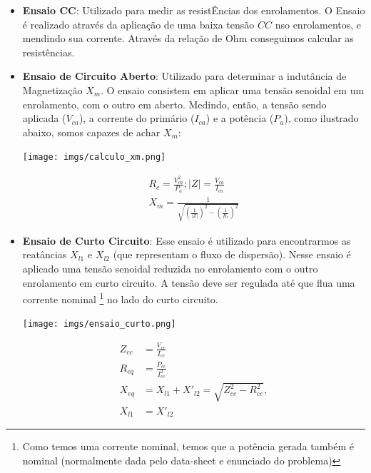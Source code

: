\documentclass{article}
\newcommand{\n}{\nonumber \\ }
\begin{document}
\begin{itemize}
    \item \textbf{Ensaio CC}: Utilizado para medir as resistÊncias dos enrolamentos. O Ensaio é realizado através da aplicação de uma baixa tensão $CC$ nso enrolamentos, e mendindo sua corrente. Através da relação de Ohm conseguimos calcular as resistências.
    \item \textbf{Ensaio de Circuito Aberto}: Utilizado para determinar a indutância de Magnetização $X_m$. O ensaio consistem em aplicar uma tensão senoidal em um enrolamento, com o outro em aberto. Medindo, então, a tensão sendo aplicada ($V_{ca}$), a corrente do primário ($I_{ca}$) e a potência ($P_a$), como ilustrado abaixo, somos capazes de achar $X_m$:
    
    \begin{minipage}{0.5\textwidth}
        \centering
        \texttt{[image: imgs/calculo\_xm.png]}
    \end{minipage}
    \begin{minipage}{0.5\textwidth}
        \begin{align}
            R_c = \frac{V_{ca}^2}{P_a}; |Z| = \frac{V_{ca}}{I_{ca}} \n 
            X_m = \frac{1}{\sqrt{\left(\frac{1}{|Z|}\right)^2 - \left(\frac{1}{R_c}\right)^2}}
        \end{align}
    \end{minipage}

    \item \textbf{Ensaio de Curto Circuito}: Esse ensaio é utilizado para encontrarmos as reatâncias $X_{l1}$ e $X_{l2}$ (que representam o fluxo de dispersão). Nesse ensaio é aplicado uma tensão senoidal reduzida no enrolamento com o outro enrolamento em curto circuito. A tensão deve ser regulada até que flua uma corrente nominal \footnote{Como temos uma corrente nominal, temos que a potência gerada também é nominal (normalmente dada pelo data-sheet e enunciado do problema)} no lado do curto circuito.

    \begin{minipage}{0.5\textwidth}
        \centering
        \texttt{[image: imgs/ensaio\_curto.png]}
    \end{minipage}
    \begin{minipage}{0.5\textwidth}
        \begin{align}
            Z_{cc} &= \frac{V_{cc}}{I_{cc}}\n
            R_{eq} &= \frac{P_{cc}}{I^2_{cc}}\n
            X_{eq} &= X_{l1} + X'_{l2} = \sqrt{Z^2_{cc} - R^2_{cc}}, \n X_{l1} &= X'_{l2}
        \end{align}
    \end{minipage}

\end{itemize}
\end{document}
